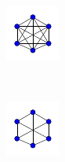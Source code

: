 \documentclass[10pt,a4paper]{article}
\theoremstyle{plain}
\theoremstyle{definition}
\begin{document}
\begin{figure}[H]
	\centering
	\begin{subfigure}[b]{0.19\textwidth}
		\includegraphics[width=\textwidth]{images/complete-graph.pdf}
		\caption{}
		\label{complete}
	\end{subfigure}
	~
	\begin{subfigure}[b]{0.19\textwidth}
		\includegraphics[width=\textwidth]{images/regular-graph.pdf}

\end{subfigure}
\end{figure}
\end{document}
